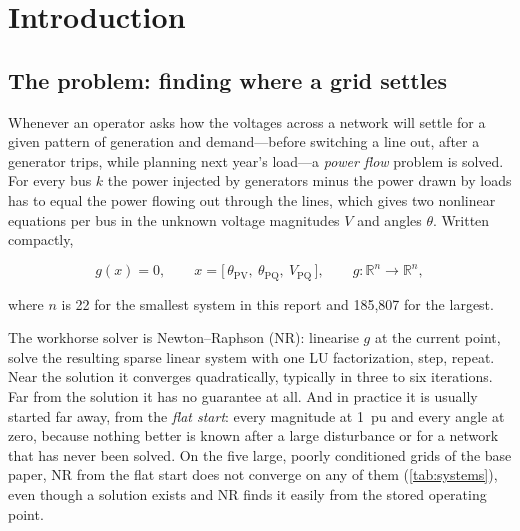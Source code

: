 \documentclass[11pt,a4paper]{article}
\begin{document}
\clearpage
\tableofcontents
\clearpage
\listoffigures
\listoftables
\clearpage
{}

\section{Introduction}\label{sec:intro}

\subsection{The problem: finding where a grid settles}
Whenever an operator asks how the voltages across a network will settle for a given pattern of
generation and demand---before switching a line out, after a generator trips, while planning next
year's load---a \emph{power flow} problem is solved. For every bus $k$ the power injected by generators
minus the power drawn by loads has to equal the power flowing out through the lines, which gives two
nonlinear equations per bus in the unknown voltage magnitudes $V$ and angles $\theta$. Written compactly,
\begin{keyeq}
\[
  g(x) = 0, \qquad x = \bigl[\,\theta_{\mathrm{PV}},\ \theta_{\mathrm{PQ}},\ V_{\mathrm{PQ}}\,\bigr],
  \qquad g:\mathbb{R}^n\to\mathbb{R}^n,
\]
\end{keyeq}
where $n$ is 22 for the smallest system in this report and 185{,}807 for the largest.

The workhorse solver is Newton--Raphson (NR): linearise $g$ at the current point, solve the resulting
sparse linear system with one LU factorization, step, repeat. Near the solution it converges
quadratically, typically in three to six iterations. Far from the solution it has no guarantee at all.
And in practice it is usually started far away, from the \emph{flat start}: every magnitude at
\SI{1}{pu} and every angle at zero, because nothing better is known after a large disturbance or for a
network that has never been solved. On the five large, poorly conditioned grids of the base paper, NR from
the flat start does not converge on any of them (\cref{tab:systems}), even though a solution exists and
NR finds it easily from the stored operating point.
\end{document}
